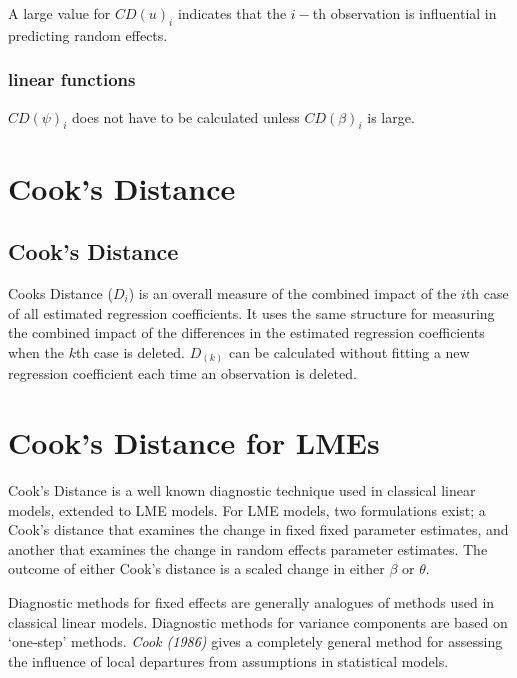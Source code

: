 \documentclass[12pt, a4paper]{article}
\begin{document}
A large value for $CD(u)_i$ indicates that the $i-$th observation is influential in predicting random effects.


\subsubsection{linear functions}


$CD(\psi)_i$ does not have to be calculated unless $CD(\beta)_i$ is large.

\section{Cook's Distance} %

\subsection{Cook's Distance}%
Cooks Distance ($D_{i}$) is an overall measure of the combined impact of the $i$th case of all estimated regression coefficients. It uses the same structure for measuring the combined impact of the differences in the estimated regression coefficients when the $k$th case is deleted. $D_{(k)}$ can be calculated without fitting
a new regression coefficient each time an observation is deleted.








\section{Cook's Distance for LMEs} %


Cook's Distance is a well known diagnostic technique used in classical linear models, extended to LME models.  For LME models, two formulations exist; a Cook's distance that examines the change in fixed fixed parameter estimates, and another that examines the change in random effects parameter estimates. The outcome of either Cook's distance is a scaled change in either $\beta$ or $\theta$.



Diagnostic methods for fixed effects are generally analogues of methods used in classical linear models.
Diagnostic methods for variance components are based on `one-step' methods.
\textit{Cook (1986)} gives a completely general method for assessing the influence of local departures from assumptions in statistical models.
\end{document}
